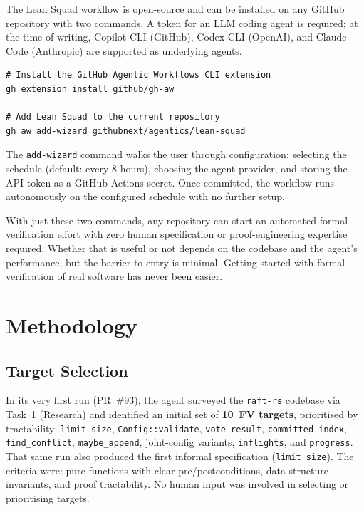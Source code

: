 \documentclass[sigconf,10pt]{acmart}
\begin{document}
The Lean Squad workflow is open-source and can be installed on any
GitHub repository with two commands.  A token for an LLM coding agent
is required; at the time of writing, Copilot CLI (GitHub),
Codex CLI (OpenAI), and Claude Code (Anthropic) are supported as
underlying agents.

\begin{lstlisting}[language={},basicstyle=\ttfamily\scriptsize,
  keywordstyle={},frame=single,xleftmargin=4pt,xrightmargin=4pt]
# Install the GitHub Agentic Workflows CLI extension
gh extension install github/gh-aw

# Add Lean Squad to the current repository
gh aw add-wizard githubnext/agentics/lean-squad
\end{lstlisting}

The \texttt{add-wizard} command walks the user through configuration:
selecting the schedule (default: every 8 hours), choosing the agent
provider, and storing the API token as a GitHub Actions secret.
Once committed, the workflow runs autonomously on the configured
schedule with no further setup.

With just these two commands, any repository can start an automated formal verification
effort with zero human specification or proof-engineering expertise required.
Whether that is useful or not depends on the codebase and the agent's
performance, but the barrier to entry is minimal. Getting started with
formal verification of real software has never been easier.

\section{Methodology}

\subsection{Target Selection}
\label{sec:targets}

In its very first run (PR~\#93), the agent surveyed the
\texttt{raft-rs} codebase via Task~1 (Research) and identified an
initial set of \textbf{10~FV targets}, prioritised by tractability:
\texttt{limit\_size}, \texttt{Config::validate}, \texttt{vote\_result},
\texttt{committed\_index}, \texttt{find\_conflict},
\texttt{maybe\_append}, joint-config variants, \texttt{inflights}, and
\texttt{progress}.  That same run also produced the first informal
specification (\texttt{limit\_size}).  The criteria were: pure
functions with clear pre/postconditions, data-structure invariants,
and proof tractability.  No human input was involved in selecting or
prioritising targets.
\end{document}
